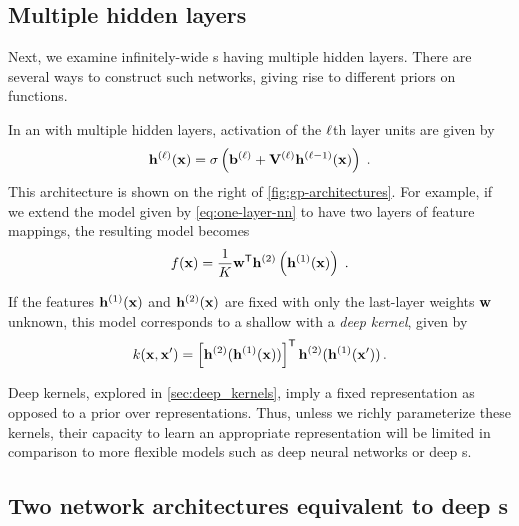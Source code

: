 \documentclass{article} %
\begin{document}
\subsection{Multiple hidden layers}
Next, we examine infinitely-wide \MLP{}s having multiple hidden layers.
There are several ways to construct such networks, giving rise to different priors on functions.

In an \MLP{} with multiple hidden layers, activation of the $\ell$th layer units are given by
%
\begin{align}
{\bf{h}}^{(\ell)}({\bf{x}}) = \sigma \left( {\bf{b}}^{(\ell)} + \mathbf{V}^{(\ell)} {\bf{h}}^{(\ell-1)}({\bf{x}}) \right) \;.
\label{eq:nextlayer}
\end{align}
This architecture is shown on the right of \cref{fig:gp-architectures}.
%
For example, if we extend the model given by \cref{eq:one-layer-nn} to have two layers of feature mappings, the resulting model becomes
%
\begin{align}
f({\bf{x}}) = \frac{1}{K}{\mathbf {{\bf{w}}}}^{\mathsf{T}} {\bf{h}}^{(2)}\left( {\bf{h}}^{(1)}({\bf{x}}) \right) \;.
\label{eq:mutli-layer-nn}
\end{align}

If the features ${\bf{h}}^{(1)}({\bf{x}})$ and ${\bf{h}}^{(2)}({\bf{x}})$ are fixed with only the last-layer weights ${{\bf{w}}}$ unknown, this model corresponds to a shallow \gp{} with a \emph{deep kernel}, given by
\begin{align}
k({\bf{x}}, {\bf{x}}') = \left[ {\bf{h}}^{(2)} ( {\bf{h}}^{(1)}({\bf{x}}) ) \right] ^{\mathsf{T}} {\bf{h}}^{(2)} ({\bf{h}}^{(1)}({\bf{x}}') ) \, .
\end{align}

Deep kernels, explored in \cref{sec:deep_kernels}, imply a fixed representation as opposed to a prior over representations.
Thus, unless we richly parameterize these kernels, their capacity to learn an appropriate representation will be limited in comparison to more flexible models such as deep neural networks or deep \gp{}s. %



 
\subsection{Two network architectures equivalent to deep \sgp{}s}
\end{document}
